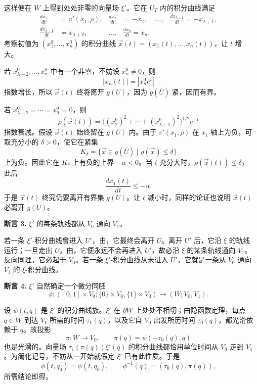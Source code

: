 这样便在 $W$ 上得到处处非零的向量场 $\xi'$。它在 $U_T$ 内的积分曲线满足
\begin{align*}
  \frac{dx_1}{dt}&=v'(x_1,\rho),&
  \frac{dx_2}{dt}&=-x_2,&\ldots,&
  \frac{dx_{\lambda+1}}{dt}=-x_{\lambda+1},\\
  \frac{dx_{\lambda+2}}{dt}&=x_{\lambda+2},&\ldots,&
  \frac{dx_n}{dt}=x_n.
\end{align*}
考察初值为 $(x_1^0,\ldots,x_n^0)$ 的积分曲线
$\vec x(t)=(x_1(t),\ldots,x_n(t))$，让 $t$ 增大。

若 $x_{\lambda+2}^0,\ldots,x_n^0$ 中有一个非零，不妨设 $x_n^0\neq0$，则
\[
  |x_n(t)|=|x_n^0e^t|
\]
指数增长，所以 $\vec x(t)$ 终将离开 $g(U)$，因为 $g(\overline U)$ 紧，因而有界。

若 $x_{\lambda+2}^0=\cdots=x_n^0=0$，则
\[
  \rho(\vec x(t))
  =\bigl((x_2^0)^2+\cdots+(x_{\lambda+1}^0)^2\bigr)^{1/2}e^{-t}
\]
指数衰减。假设 $\vec x(t)$ 始终留在 $g(U)$ 内。由于 $v'(x_1,\rho)$ 在 $x_1$ 轴上为负，可取充分小的 $\delta>0$，使它在紧集
\[
  K_\delta=\{\vec x\in g(\overline U)\mid\rho(\vec x)\leq\delta\}
\]
上为负。因此它在 $K_\delta$ 上有负的上界 $-\alpha<0$。当 $t$ 充分大时，$\rho(\vec x(t))\leq\delta$，此后
\[
  \frac{dx_1(t)}{dt}\leq-\alpha.
\]
于是 $\vec x(t)$ 终究仍要离开有界集 $g(U)$。让 $t$ 减小时，同样的论证也说明 $\vec x(t)$ 必离开 $g(U)$。
\EndProof

\par\medskip\noindent{}\label{claim:5.3}\textbf{断言 3.}\quad\label{sec5:page53}
$\xi'$ 的每条轨线都从 $V_0$ 通向 $V_1$。

\Proof 若一条 $\xi'$-积分曲线曾进入 $U'$，由，它最终会离开 $U$。离开 $U'$ 后，它沿 $\xi$ 的轨线运行；一旦走出 $U$，由，它便永远不会再进入 $U'$，故必沿 $\xi$ 的某条轨线通向 $V_1$。反向同理，它必起于 $V_0$。若一条 $\xi'$-积分曲线从未进入 $U'$，它就是一条从 $V_0$ 通向 $V_1$ 的 $\xi$-积分曲线。
\EndProof

\par\medskip\noindent{}\label{claim:5.4}\textbf{断言 4.}\quad
$\xi'$ 自然确定一个微分同胚
\[
  \phi:([0,1]\times V_0;\{0\}\times V_0,\{1\}\times V_0)
  \longrightarrow(W;V_0,V_1).
\]

\Proof 设 $\psi(t,q)$ 是 $\xi'$ 的积分曲线族。$\xi'$ 在 $\partial W$ 上处处不相切；由隐函数定理，每点 $q\in W$ 到达 $V_1$ 所需的时间 $\tau_1(q)$，以及它自 $V_0$ 出发所历时间 $\tau_0(q)$，都光滑依赖于 $q$。故投影
\[
  \pi:W\longrightarrow V_0,
  \qquad
  \pi(q)=\psi(-\tau_0(q),q)
\]
也是光滑的。向量场 $\tau_1(\pi(q))\xi'(q)$ 的积分曲线都恰用单位时间从 $V_0$ 走到 $V_1$。为简化记号，不妨从一开始就假定 $\xi'$ 已有此性质。于是
\[
  \phi(t,q_0)=\psi(t,q_0),
  \qquad
  \phi^{-1}(q)=(\tau_0(q),\pi(q)),
\]
所需结论即得。
\EndProof


